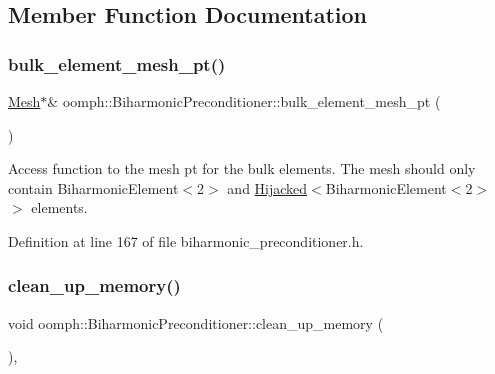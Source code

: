 \subsection{Member Function Documentation}
\mbox{\label{classoomph_1_1BiharmonicPreconditioner_abf6fed648ba0686273c79d0b85f61993}} 
\subsubsection{\texorpdfstring{bulk\+\_\+element\+\_\+mesh\+\_\+pt()}{bulk\_element\_mesh\_pt()}}
{\footnotesize\ttfamily \hyperlink{classoomph_1_1Mesh}{Mesh}$\ast$\& oomph\+::\+Biharmonic\+Preconditioner\+::bulk\+\_\+element\+\_\+mesh\+\_\+pt (\begin{DoxyParamCaption}{ }\end{DoxyParamCaption})\hspace{0.3cm}{\ttfamily [inline]}}



Access function to the mesh pt for the bulk elements. The mesh should only contain Biharmonic\+Element$<$2$>$ and \hyperlink{classoomph_1_1Hijacked}{Hijacked}$<$Biharmonic\+Element$<$2$>$ $>$ elements. 



Definition at line 167 of file biharmonic\+\_\+preconditioner.\+h.

\mbox{\label{classoomph_1_1BiharmonicPreconditioner_a1eec48fe85c0246c1a9ba1ad4cfa74e6}} 
\subsubsection{\texorpdfstring{clean\+\_\+up\+\_\+memory()}{clean\_up\_memory()}}
{\footnotesize\ttfamily void oomph\+::\+Biharmonic\+Preconditioner\+::clean\+\_\+up\+\_\+memory (\begin{DoxyParamCaption}{ }\end{DoxyParamCaption})\hspace{0.3cm}{\ttfamily [inline]}, {\ttfamily [virtual]}}



